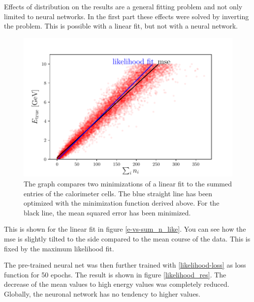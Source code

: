 \documentclass[12pt, a4paper]{thesis}
\begin{document}
Effects of distribution on the results are a general fitting problem and not only limited to neural networks. In the first part these effects were solved by inverting the problem. This is possible with a linear fit, but not with a neural network.

\begin{figure}[htbp]
\centering
\includegraphics[width=.9\linewidth]{../images/e-vs-sum_n_like.pdf}
\caption{\label{fig:org073b8cd}
The graph compares two minimizations of a linear fit to the summed entries of the calorimeter cells. The blue straight line has been optimized with the minimization function derived above. For the black line, the mean squared error has been minimized.}
\end{figure}

This is shown for the linear fit in figure \ref{e-vs-sum_n_like}. You
can see how the mse is slightly tilted to the side compared to the
mean course of the data. This is fixed by the maximum likelihood fit.

The pre-trained neural net was then further trained with
\eqref{likelihood-loss} as loss function for 50 epochs. The result is
shown in figure \ref{likelihood_res}. The decrease of the mean values to
high energy values was completely reduced. Globally, the neuronal
network has no tendency to higher values.
\end{document}
